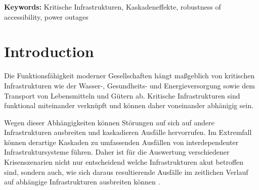 
\begin{abstract}
    Der Abstrakt gehört hier hin.

\end{abstract}

\noindent\textbf{Keywords:}%
Kritische Infrastrukturen, Kaskadeneffekte, robustness of accessibility, power outages


\section{Introduction}
\label{sec:introduction}



Die Funktionsfähigkeit moderner Gesellschaften hängt maßgeblich von kritischen Infrastrukturen wie der Wasser-, Gesundheits- und Energieversorgung sowie dem Transport von Lebensmitteln und Gütern ab\cite{lickert2024,chiaradonna2007}. Kritische Infrastrukturen sind funktional miteinander verknüpft und können daher voneinander abhänigig sein\cite{chiaradonna2007}.



Wegen dieser Abhängigkeiten können Störungen auf sich auf andere Infrastrukturen ausbreiten und kaskadieren Ausfälle hervorrufen\cite{laprie2007}. Im Extremfall können derartige Kaskaden zu umfassenden Ausfällen von interdependenter Infrastruktursysteme führen\cite{buldyrev2010}. Daher ist für die Auswertung verschiedener Krisenszenarien nicht nur entscheidend welche Infrastrukturen akut betroffen sind, sondern auch, wie sich daraus resultierende Ausfälle im zeitlichen Verlauf auf abhängige Infrastrukturen ausbreiten können \cite{lickert2024}.




